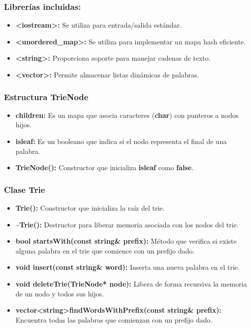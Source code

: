 \documentclass[corference]{IEEEtran}
\begin{document}
\begin{flushleft}
                \subsubsection{Librerías incluidas:}
                \begin{itemize}
                    \item \textbf{\textless iostream\textgreater:} Se utiliza para entrada/salida estándar.
                    \item \textbf{\textless unordered\_map\textgreater:} Se utiliza para implementar un mapa hash eficiente.
                    \item \textbf{\textless string\textgreater:} Proporciona soporte para manejar cadenas de texto.
                    \item \textbf{\textless vector\textgreater:} Permite almacenar listas dinámicas de palabras.
                \end{itemize}
                
                \subsubsection{Estructura TrieNode}
                \begin{itemize}
                    \item \textbf{children:} Es un mapa que asocia caracteres (\textbf{char}) con punteros a nodos hijos.
                    \item \textbf{isleaf:} Es un booleano que indica si el nodo representa el final de una palabra.
                    \item \textbf{TrieNode():} Constructor que inicializa \textbf{isleaf} como \textbf{false}.
                \end{itemize}
                
                \subsubsection{Clase Trie}
                \begin{itemize}
                    \item \textbf{Trie():} Constructor que inicializa la raíz del trie.
                    \item \textbf{\textasciitilde Trie():} Destructor para liberar memoria asociada con los nodos del trie.
                    \item \textbf{bool startsWith(const string\& prefix):} Método que verifica si existe alguna palabra en el trie que comience con un prefijo dado.
                    \item \textbf{void insert(const string\& word):} Inserta una nueva palabra en el trie.
                    \item \textbf{void deleteTrie(TrieNode* node):} Libera de forma recursiva la memoria de un nodo y todos sus hijos.
                    \item \textbf{vector\textless string\textgreater findWordsWithPrefix(const string\& prefix):} Encuentra todas las palabras que comienzan con un prefijo dado.
                \end{itemize}
                

\end{flushleft}
\end{document}
